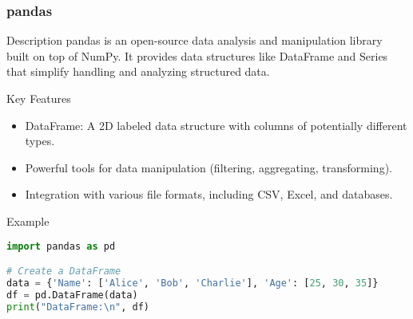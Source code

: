 \documentclass[aspectratio=169]{beamer}
\begin{document}
\begin{frame}[fragile]
    \frametitle{pandas}
    \begin{block}{Description}
        pandas is an open-source data analysis and manipulation library built on top of NumPy. It provides data structures like DataFrame and Series that simplify handling and analyzing structured data.
    \end{block}
    \begin{block}{Key Features}
        \begin{itemize}
            \item DataFrame: A 2D labeled data structure with columns of potentially different types.
            \item Powerful tools for data manipulation (filtering, aggregating, transforming).
            \item Integration with various file formats, including CSV, Excel, and databases.
        \end{itemize}
    \end{block}
    \begin{block}{Example}
        \begin{lstlisting}[language=Python]
import pandas as pd

# Create a DataFrame
data = {'Name': ['Alice', 'Bob', 'Charlie'], 'Age': [25, 30, 35]}
df = pd.DataFrame(data)
print("DataFrame:\n", df)
        \end{lstlisting}
    \end{block}
\end{frame}
\end{document}
